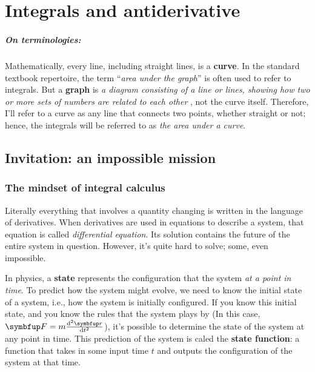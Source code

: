 \chapter{Integrals and antiderivative}
\label{sec:integrals}


\paragraph{On terminologies:} Mathematically, every line, including straight lines, is a \textbf{curve}. In the standard textbook repertoire, the term ``\emph{area under the graph}'' is often used to refer to integrals. But a \textbf{graph} is \textit{a diagram consisting of a line or lines, showing how two or more sets of numbers are related to each other} \cite{oxforddict}, not the curve itself. Therefore, I'll refer to a curve as any line that connects two points, whether straight or not; hence, the integrals will be referred to as \emph{the area under a curve}.

\section{Invitation: an impossible mission}

\subsection{The mindset of integral calculus}

Literally everything that involves a quantity changing is written in the language of derivatives. When derivatives are used in equations to describe a system, that equation is called \emph{differential equation}. Its solution contains the future of the entire system in question. However, it's quite hard to solve; some, even impossible.

In physics, a \textbf{state} represents the configuration that the system \emph{at a point in time}. To predict how the system might evolve, we need to know the initial state of a system, i.e., how the system is initially configured. If you know this initial state, and you know the rules that the system plays by (In this case, \(\vv{F} = m\odv[ord = 2]{\vv{r}}{t}\)), it's possible to determine the state of the system at any point in time. This prediction of the system is caled the \textbf{state function}: a function that takes in some input time \(t\) and outputs the configuration of the system at that time.

